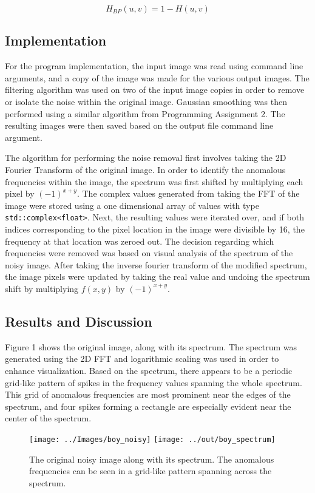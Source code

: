 \documentclass[headings=optiontoheadandtoc,listof=totoc,parskip=full]{scrartcl}
\begin{document}
\[
	H_{BP}(u,v) = 1 - H(u,v)
\]


\subsection{Implementation}

For the program implementation, the input image was read using command line arguments, and a copy of the image was made for the various output images. The filtering algorithm was used on two of the input image copies in order to remove or isolate the noise within the original image. Gaussian smoothing was then performed using a similar algorithm from Programming Assignment 2. The resulting images were then saved based on the output file command line argument.

The algorithm for performing the noise removal first involves taking the 2D Fourier Transform of the original image. In order to identify the anomalous frequencies within the image, the spectrum was first shifted by multiplying each pixel by $(-1)^{x + y}$. The complex values generated from taking the FFT of the image were stored using a one dimensional array of values with type \texttt{std::complex<float>}. Next, the resulting values were iterated over, and if both indices corresponding to the pixel location in the image were divisible by 16, the frequency at that location was zeroed out. The decision regarding which frequencies were removed was based on visual analysis of the spectrum of the noisy image. After taking the inverse fourier transform of the modified spectrum, the image pixels were updated by taking the real value and undoing the spectrum shift by multiplying $f(x,y)$ by $(-1)^{x + y}$.

\subsection{Results and Discussion}

Figure 1 shows the original image, along with its spectrum. The spectrum was generated using the 2D FFT and logarithmic scaling was used in order to enhance visualization. Based on the spectrum, there appears to be a periodic grid-like pattern of spikes in the frequency values spanning the whole spectrum. This grid of anomalous frequencies are most prominent near the edges of the spectrum, and four spikes forming a rectangle are especially evident near the center of the spectrum. 

\begin{figure}[H]
	\centering
	\texttt{[image: ../Images/boy\_noisy]}
	\texttt{[image: ../out/boy\_spectrum]}
	\caption{The original noisy image along with its spectrum. The anomalous frequencies can be seen in a grid-like pattern spanning across the spectrum.}
	\label{fig:boyNoisy}
\end{figure}
\end{document}
